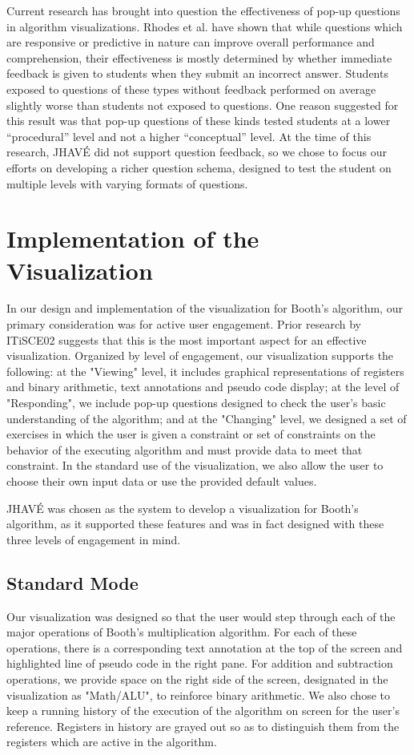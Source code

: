 \documentclass{acm_proc_article-sp}
\begin{document}
Current research has brought into question the effectiveness of pop-up questions in algorithm visualizations.
Rhodes et al.
have shown that while questions which are responsive or predictive in nature can improve overall performance and comprehension, their effectiveness is mostly determined by whether immediate feedback is given to students when they submit an incorrect answer.
Students exposed to questions of these types without feedback performed on average slightly worse than students not exposed to questions.
One reason suggested for this result was that pop-up questions of these kinds tested students at a lower ``procedural'' level and not a higher ``conceptual'' level.\cite{intquest}
At the time of this research, JHAVÉ did not support question feedback, so we chose to focus our efforts on developing a richer question schema, designed to test the student on multiple levels with varying formats of questions.

\section{Implementation of the Visualization}
In our design and implementation of the visualization for Booth's algorithm, our primary consideration was for active user engagement.
Prior research by ITiSCE02 suggests that this is the most important aspect for an effective visualization.\cite{tnaps:visengage}
Organized by level of engagement, our visualization supports the following: at the "Viewing" level, it includes graphical representations of registers and binary arithmetic, text annotations and pseudo code
 display; at the level of "Responding", we include pop-up questions designed to check the user's basic understanding of the algorithm; and at the "Changing" level, we designed a set of exercises in which the user is given a constraint or set of constraints on the behavior of the executing algorithm and must provide data to meet that constraint.
In the standard use of the visualization, we also allow the user to choose their own input data or use the provided default values.

JHAVÉ was chosen as the system to develop a visualization for Booth's algorithm, as it supported these features and was in fact designed with these three levels of engagement in mind.\cite{JHAVE}

\subsection{Standard Mode}
Our visualization was designed so that the user would step through each of the major operations of Booth's multiplication algorithm.
For each of these operations, there is a corresponding text annotation at the top of the screen and highlighted line of pseudo code in the right pane.
For addition and subtraction operations, we provide space on the right side of the screen, designated in the visualization as "Math/ALU", to reinforce binary arithmetic.
We also chose to keep a running history of the execution of the algorithm on screen for the user's reference.
Registers in history are grayed out so as to distinguish them from the registers which are active in the algorithm.
\end{document}
